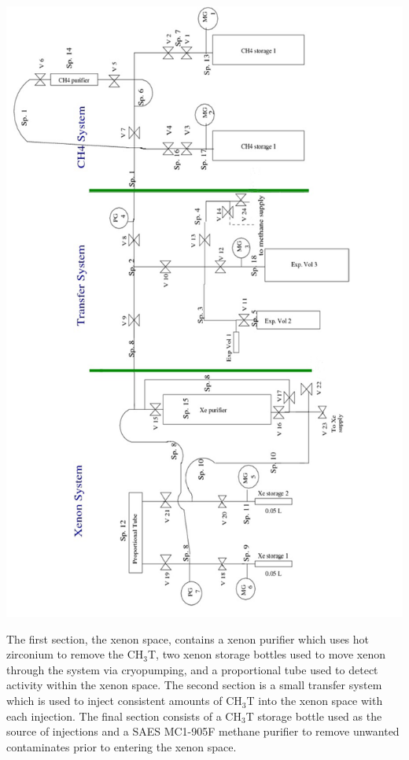\documentclass[a4paper,12pt]{article}
\begin{document}
\begin{center}
\includegraphics[scale=0.5]{GasSystem.png}
\end{center}

The first section, the xenon space, contains a xenon purifier which uses hot zirconium to remove the CH$_3$T, two xenon storage bottles used to move xenon through the system via cryopumping, and a proportional tube used to detect activity within the xenon space.  The second section is a small transfer system which is used to inject consistent amounts of CH$_3$T into the xenon space with each injection.  The final section consists of a CH$_3$T storage bottle used as the source of injections and a SAES MC1-905F methane purifier to remove unwanted contaminates prior to entering the xenon space.
\end{document}

